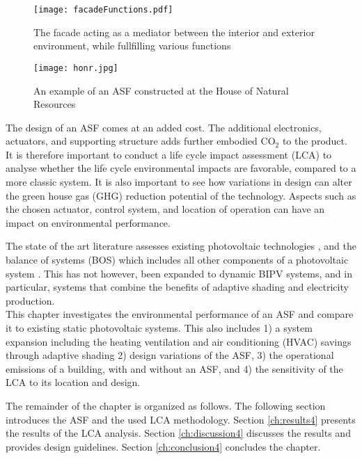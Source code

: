 \begin{figure}
\begin{center}
\texttt{[image: facadeFunctions.pdf]}
\caption{The facade acting as a mediator between the interior and exterior environment, while fullfilling various functions \cite{nagy2016adaptive}}
\label{fig:ASFschematic4}
\end{center}
\end{figure}

\begin{figure}
\begin{center}
\texttt{[image: honr.jpg]}
\caption{An example of an ASF constructed at the House of Natural Resources \cite{nagy2016adaptive}}
\label{fig:HoNR4}
\end{center}
\end{figure}

The design of an ASF comes at an added cost. The additional electronics, actuators, and supporting structure adds further embodied CO$_2$ to the product. It is therefore important to conduct a life cycle impact assessment (LCA) to analyse whether the life cycle environmental impacts are favorable, compared to a more classic system. It is also important to see how variations in design can alter the green house gas (GHG) reduction potential of the technology. Aspects such as the chosen actuator, control system, and location of operation can have an impact on environmental performance. 

The state of the art literature assesses existing photovoltaic technologies \cite{raugei2007life, de2013energy, fthenakis2011photovoltaics}, and the balance of systems (BOS) which includes all other components of a photovoltaic system \cite{mason2006energy}. This has not however, been expanded to dynamic BIPV systems, and in particular, systems that combine the benefits of adaptive shading and electricity production.\\


This chapter investigates the environmental performance of an ASF and compare it to existing static photovoltaic systems. This also includes 1) a system expansion including the heating ventilation and air conditioning (HVAC) savings through adaptive shading 2) design variations of the ASF, 3) the operational emissions of a building, with and without an ASF, and 4) the sensitivity of the LCA to its location and design.



The remainder of the chapter is organized as follows. The following section introduces the ASF and the used LCA methodology. Section \ref{ch:results4} presents the results of the LCA analysis. Section \ref{ch:discussion4} discusses the results and provides design guidelines. Section \ref{ch:conclusion4} concludes the chapter.

